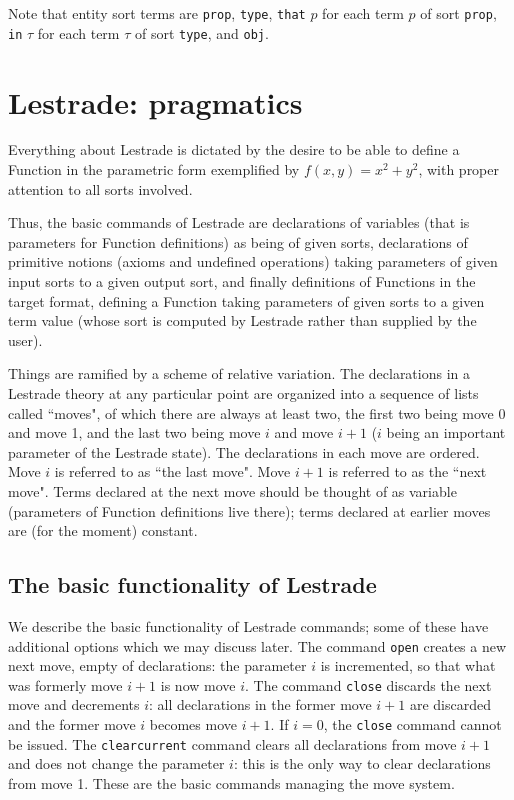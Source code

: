 \documentclass{article}
\begin{document}
Note that entity sort terms are {\tt prop}, {\tt type}, {\tt that} $p$ for each term $p$ of sort {\tt prop}, {\tt in} $\tau$ for each term $\tau$ of sort
{\tt type}, and {\tt obj}.

\newpage


\section{Lestrade:  pragmatics}

Everything about Lestrade is dictated by the desire to be able to define a Function in the parametric form exemplified by $f(x,y)=x^2+y^2$, with proper attention to all sorts involved.

Thus, the basic commands of Lestrade are declarations of variables (that is parameters for Function definitions) as being of given sorts, declarations of
primitive notions (axioms and undefined operations) taking parameters of given input sorts to a given output sort, and finally definitions of Functions in the target format, defining a Function taking parameters of given sorts to a given term value (whose sort is computed by Lestrade rather than supplied by the user).

Things are ramified by a scheme of relative variation.  The declarations in a Lestrade theory at any particular point are organized into a sequence of lists
called ``moves", of which there are always at least two, the first two being move 0 and move 1, and the last two being move $i$ and move $i+1$ ($i$ being an important parameter of the Lestrade state).  The declarations in each move are ordered.  Move $i$ is referred to as ``the last move".  Move $i+1$ is referred to as the ``next move".  Terms declared at the next move should be thought of as variable (parameters of Function definitions live there);  terms declared at earlier moves are (for the moment) constant.

\subsection{The basic functionality of Lestrade}

We describe the basic functionality of Lestrade commands;  some of these have additional options which we may discuss later.  The command {\tt open}
creates a new next move, empty of declarations:  the parameter $i$ is incremented, so that what was formerly move $i+1$ is now move $i$.  The command
{\tt close} discards the next move and decrements $i$:  all declarations in the former move $i+1$ are discarded and the former move $i$ becomes move $i+1$.  If $i=0$, the {\tt close} command cannot be issued.  The {\tt clearcurrent} command clears all declarations from move $i+1$ and does not change the parameter $i$:  this is the only way to clear declarations from move 1.  These are the basic commands managing the move system.
\end{document}
